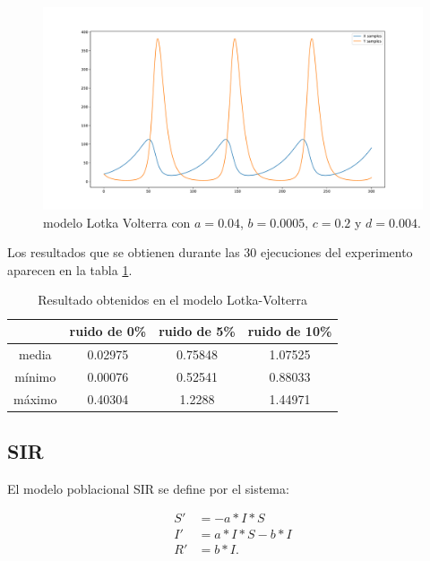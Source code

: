 \begin{figure}[h]
    \centering
    \includegraphics[width=\textwidth]{"figures/lotka_volterra.pdf"}
    \caption{modelo Lotka Volterra con $a = 0.04$, $b = 0.0005$, $c = 0.2$ y $d = 0.004$.}
    \label{fig:lotka_volterra}
\end{figure}

Los resultados que se obtienen durante las 30 ejecuciones del experimento aparecen en la tabla \ref{table:experiment_lotka_volterra}.

\begin{table}[!h]
    \centering
    \caption{Resultado obtenidos en el modelo Lotka-Volterra}
    \begin{tabular}{|c|c|c|c|}
        \hline
               & \textbf{ruido de 0\%} & \textbf{ruido de 5\%} & \textbf{ruido de 10\%} \\
        \hline
        media  & 0.02975               & 0.75848               & 1.07525                \\
        \hline
        mínimo & 0.00076               & 0.52541               & 0.88033                \\
        \hline
        máximo & 0.40304               & 1.2288                & 1.44971                \\
        \hline
    \end{tabular}
    \label{table:experiment_lotka_volterra}
\end{table}


\subsection{SIR}

El modelo poblacional SIR se define por el sistema:

\begin{align*}
    S' & = - a*I*S     \\
    I' & = a*I*S - b*I \\
    R' & = b*I.
\end{align*}

